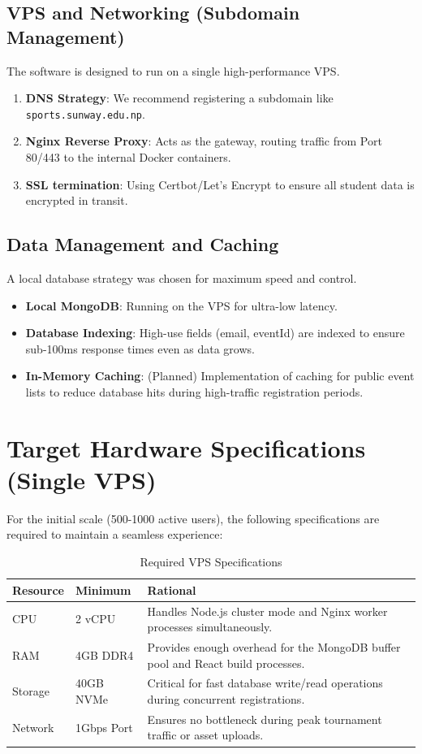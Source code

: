 \documentclass[12pt,a4paper]{article}
\begin{document}
\subsection{VPS and Networking (Subdomain Management)}
The software is designed to run on a single high-performance VPS.
\begin{enumerate}
    \item \textbf{DNS Strategy}: We recommend registering a subdomain like \texttt{sports.sunway.edu.np}.
    \item \textbf{Nginx Reverse Proxy}: Acts as the gateway, routing traffic from Port 80/443 to the internal Docker containers.
    \item \textbf{SSL termination}: Using Certbot/Let's Encrypt to ensure all student data is encrypted in transit.
\end{enumerate}

\subsection{Data Management and Caching}
A local database strategy was chosen for maximum speed and control.
\begin{itemize}
    \item \textbf{Local MongoDB}: Running on the VPS for ultra-low latency.
    \item \textbf{Database Indexing}: High-use fields (email, eventId) are indexed to ensure sub-100ms response times even as data grows.
    \item \textbf{In-Memory Caching}: (Planned) Implementation of caching for public event lists to reduce database hits during high-traffic registration periods.
\end{itemize}

\section{Target Hardware Specifications (Single VPS)}

For the initial scale (500-1000 active users), the following specifications are required to maintain a seamless experience:
\begin{table}[h!]
\centering
\caption{Required VPS Specifications}
\begin{tabular}{llp{8cm}}
\toprule
\textbf{Resource} & \textbf{Minimum} & \textbf{Rational} \\
\midrule
CPU & 2 vCPU & Handles Node.js cluster mode and Nginx worker processes simultaneously. \\
RAM & 4GB DDR4 & Provides enough overhead for the MongoDB buffer pool and React build processes. \\
Storage & 40GB NVMe & Critical for fast database write/read operations during concurrent registrations. \\
Network & 1Gbps Port & Ensures no bottleneck during peak tournament traffic or asset uploads. \\
\bottomrule
\end{tabular}
\end{table}
\end{document}
